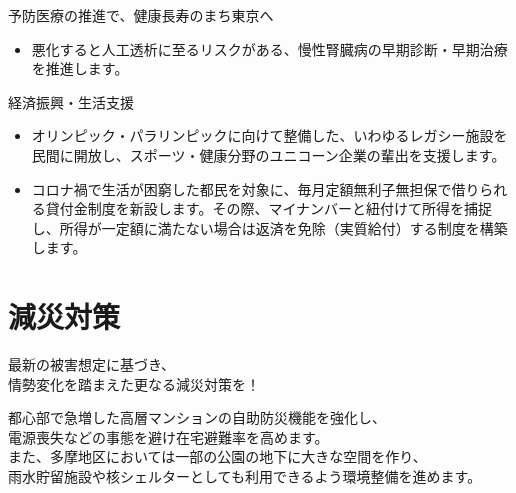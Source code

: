 \documentclass[dvipdfmx]{beamer}
\begin{document}
    \begin{frame}{予防医療の推進で、健康長寿のまち東京へ}{}
        \begin{small}
            \begin{itemize}
                \setlength{\itemsep}{2mm}
                \item 悪化すると人工透析に至るリスクがある、慢性腎臓病の早期診断・早期治療を推進します。
            \end{itemize}
        \end{small}
    \end{frame}

    \begin{frame}{経済振興・生活支援}{}
        \begin{small}
            \begin{itemize}
                \setlength{\itemsep}{2mm}
                \item オリンピック・パラリンピックに向けて整備した、いわゆるレガシー施設を民間に開放し、スポーツ・健康分野のユニコーン企業の輩出を支援します。
                \item コロナ禍で生活が困窮した都民を対象に、毎月定額無利子無担保で借りられる貸付金制度を新設します。その際、マイナンバーと紐付けて所得を捕捉し、所得が一定額に満たない場合は返済を免除（実質給付）する制度を構築します。
            \end{itemize}
        \end{small}
    \end{frame}

\section{減災対策}
    \begin{frame}
        \sectionpage
        \begin{center}
            \begin{large}
                \alert{最新の被害想定に基づき、}\\\alert{情勢変化を踏まえた更なる減災対策を！}
            \end{large}
        \end{center}
        \begin{small}
            都心部で急増した高層マンションの自助防災機能を強化し、\\
            電源喪失などの事態を避け在宅避難率を高めます。\\
            また、多摩地区においては一部の公園の地下に大きな空間を作り、\\
            雨水貯留施設や核シェルターとしても利用できるよう環境整備を進めます。
        \end{small}
    \end{frame}
\end{document}
